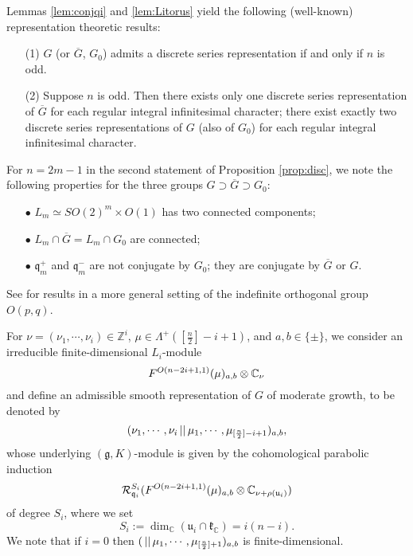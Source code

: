 Lemmas \ref{lem:conjqi} and \ref{lem:Litorus} yield the following 
 (well-known) representation theoretic results:
\begin{proposition}
\label{prop:disc}
\begin{enumerate}
\item[{\rm{(1)}}]
$G$ (or $\overline G$, $G_0$) admits a discrete series representation
 if and only if $n$ is odd.  
\item[{\rm{(2)}}]
Suppose $n$ is odd.  
Then there exists only one discrete series representation of $\overline G$
 for each regular integral infinitesimal character;
there exist exactly two discrete series representations of $G$
 (also of $G_0$)
 for each regular integral infinitesimal character.  
\end{enumerate}
\end{proposition}
For $n=2m-1$ in the second statement of Proposition \ref{prop:disc}, 
 we note the following properties
 for the three groups $G \supset \overline G \supset G_0$: 
\begin{enumerate}
\item[$\bullet$]
$L_m \simeq SO(2)^m \times O(1)$
 has two connected components;
\item[$\bullet$]
$L_m \cap \overline G=L_m \cap G_0$ are connected;
\item[$\bullet$]
${\mathfrak{q}}_m^+$ and ${\mathfrak{q}}_m^-$ are not conjugate
 by $G_0$;
 they are conjugate by $\overline G$ or $G$.  
\end{enumerate}
See \cite[Thm.~3 (0)]{KMemoirs92} 
 for results in a more general setting
 of the indefinite orthogonal group $O(p,q)$.  



For $\nu =(\nu_1, \cdots, \nu_i) \in {\mathbb{Z}}^i$, 
 $\mu \in \Lambda^+([\frac n 2]-i+1)$, 
 and $a, b \in \{\pm \}$, 
 we consider an irreducible finite-dimensional $L_i$-module
\[
  F^{{O(n-2i+1,1)}}({\mu})_{a, b} \otimes {\mathbb{C}}_{\nu}
\]
and define an admissible smooth representation of $G$ of moderate growth, 
 to be denoted by 
\[
  ({\nu_1, \cdots, \nu_i}\,||\,{\mu_1, \cdots, \mu_{[\frac n 2]-i+1}})_{a, b}, 
\]
 whose underlying $({\mathfrak{g}},K)$-module
 is given by the cohomological parabolic induction
\begin{equation}
\label{eqn:Rqmunu}
  {\mathcal{R}}_{{\mathfrak {q}}_i}^{S_i}(F^{{O(n-2i+1,1)}}({\mu})_{a, b} \otimes {\mathbb{C}}_{\nu+\rho({\mathfrak{u}}_i)})
\end{equation}
 of degree $S_i$,  
where we set
\begin{equation}
\label{eqn:cohSi}
   S_i:= \dim_{\mathbb{C}} ({\mathfrak {u}}_i \cap {\mathfrak {k}}_{\mathbb{C}})       =i(n-i).  
\end{equation}
We note
 that if $i=0$
 then $({}\,||\,{\mu_1, \cdots, \mu_{[\frac n 2]+1}})_{a, b}$ is
 finite-dimensional.  


